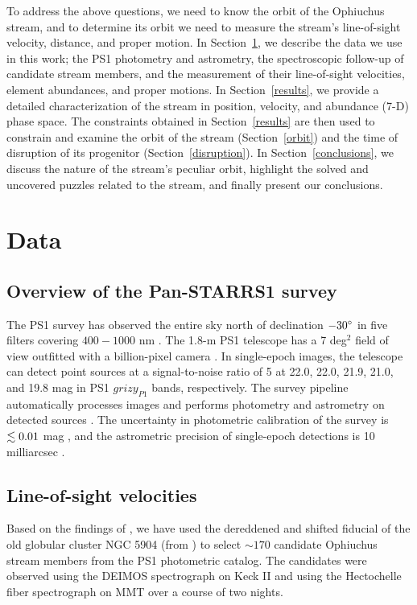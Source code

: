 \documentclass[iop]{emulateapj}
\begin{document}
To address the above questions, we need to know the orbit of the Ophiuchus
stream, and to determine its orbit we need to measure the stream's line-of-sight
velocity, distance, and proper motion. In Section~\ref{data}, we describe the
data we use in this work; the PS1 photometry and astrometry, the spectroscopic
follow-up of candidate stream members, and the measurement of their
line-of-sight velocities, element abundances, and proper motions. In
Section~\ref{results}, we provide a detailed characterization of the stream in
position, velocity, and abundance (7-D) phase space. The constraints obtained in
Section~\ref{results} are then used to constrain and examine the orbit of the
stream (Section~\ref{orbit}) and the time of disruption of its progenitor
(Section~\ref{disruption}). In Section~\ref{conclusions}, we discuss the nature
of the stream's peculiar orbit, highlight the solved and uncovered puzzles
related to the stream, and finally present our conclusions.

\section{Data}\label{data}

\subsection{Overview of the Pan-STARRS1 survey}\label{PS1}

The PS1 survey has observed the entire sky north of declination $-30\mbox{$^\circ$}$ in
five filters covering $400-1000$ nm \citep{stu10, ton12}. The 1.8-m PS1
telescope has a 7 deg$^2$ field of view outfitted with a billion-pixel camera
\citep{hod04, ona08, to09}. In single-epoch images, the telescope can detect
point sources at a signal-to-noise ratio of 5 at 22.0, 22.0, 21.9, 21.0, and
19.8 mag in PS1 $grizy_{P1}$ bands, respectively. The survey pipeline
automatically processes images and performs photometry and astrometry on
detected sources \citep{mag06, mag07}. The uncertainty in photometric
calibration of the survey is $\lesssim0.01$ mag \citep{sch12}, and the astrometric
precision of single-epoch detections is 10 milliarcsec
\citep[hereafter mas]{mag08}.

\subsection{Line-of-sight velocities}

Based on the findings of \citet{ber14b}, we have used the dereddened and shifted
fiducial of the old globular cluster NGC 5904 (from \citealt{ber14a}) to select
$\sim170$ candidate Ophiuchus stream members from the PS1 photometric catalog.
The candidates were observed using the DEIMOS spectrograph on Keck II
\citep{fab02} and using the Hectochelle fiber spectrograph on MMT \citep{sze11}
over a course of two nights.
\end{document}

